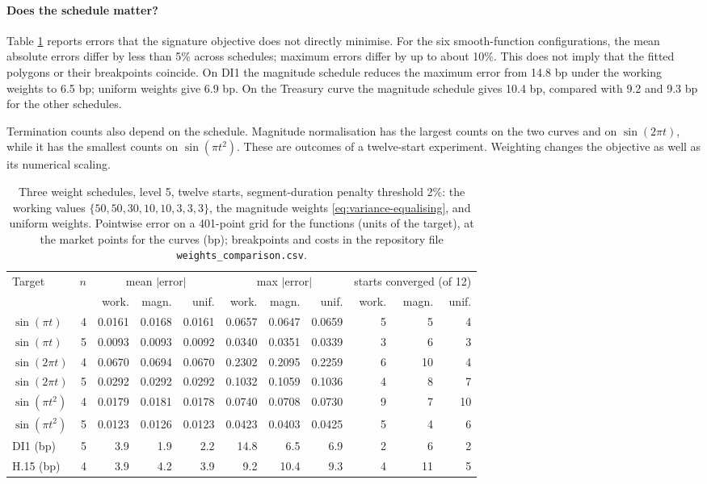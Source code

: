 \documentclass[11pt,english]{article}
\theoremstyle{definition}
\theoremstyle{remark}
\begin{document}
\paragraph{Does the schedule matter?}
Table \ref{tab:weights} reports errors that the signature objective
does not directly minimise. For the six smooth-function configurations,
the mean absolute errors differ by less than 5\% across schedules;
maximum errors differ by up to about 10\%. This does not imply that
the fitted polygons or their breakpoints coincide. On DI1 the
magnitude schedule reduces the maximum error from 14.8 bp under
the working weights to 6.5 bp; uniform weights give 6.9 bp.
On the Treasury curve the magnitude schedule gives 10.4 bp,
compared with 9.2 and 9.3 bp for the other schedules.

Termination counts also depend on the schedule. Magnitude
normalisation has the largest counts on the two curves and on
$\sin(2\pi t)$, while it has the smallest counts on
$\sin(\pi t^2)$. These are outcomes of a twelve-start experiment.
Weighting changes the objective as well as its numerical scaling.

\begin{table}[H]
\centering
\small
\begin{tabular}{@{}lr rrr rrr rrr@{}}
\toprule
Target & $n$ & \multicolumn{3}{c}{mean $|$error$|$} & \multicolumn{3}{c}{max $|$error$|$} & \multicolumn{3}{c}{starts converged (of 12)} \\
\cmidrule(lr){3-5}\cmidrule(lr){6-8}\cmidrule(lr){9-11}
 & & work. & magn. & unif. & work. & magn. & unif. & work. & magn. & unif. \\
\midrule
$\sin(\pi t)$ & 4 & 0.0161 & 0.0168 & 0.0161 & 0.0657 & 0.0647 & 0.0659 & 5 & 5 & 4 \\
$\sin(\pi t)$ & 5 & 0.0093 & 0.0093 & 0.0092 & 0.0340 & 0.0351 & 0.0339 & 3 & 6 & 3 \\
$\sin(2\pi t)$ & 4 & 0.0670 & 0.0694 & 0.0670 & 0.2302 & 0.2095 & 0.2259 & 6 & 10 & 4 \\
$\sin(2\pi t)$ & 5 & 0.0292 & 0.0292 & 0.0292 & 0.1032 & 0.1059 & 0.1036 & 4 & 8 & 7 \\
$\sin(\pi t^{2})$ & 4 & 0.0179 & 0.0181 & 0.0178 & 0.0740 & 0.0708 & 0.0730 & 9 & 7 & 10 \\
$\sin(\pi t^{2})$ & 5 & 0.0123 & 0.0126 & 0.0123 & 0.0423 & 0.0403 & 0.0425 & 5 & 4 & 6 \\
DI1 (bp) & 5 & 3.9 & 1.9 & 2.2 & 14.8 & 6.5 & 6.9 & 2 & 6 & 2 \\
H.15 (bp) & 4 & 3.9 & 4.2 & 3.9 & 9.2 & 10.4 & 9.3 & 4 & 11 & 5 \\
\bottomrule
\end{tabular}
\caption{Three weight schedules, level 5, twelve starts, segment-duration
penalty threshold 2\%: the working values $\{50,50,30,10,10,3,3,3\}$,
the magnitude weights \eqref{eq:variance-equalising}, and uniform weights. Pointwise
error on a 401-point grid for the functions (units of the target), at
the market points for the curves (bp); breakpoints and costs in the
repository file \texttt{weights\_comparison.csv}.\label{tab:weights}}
\end{table}
\end{document}
